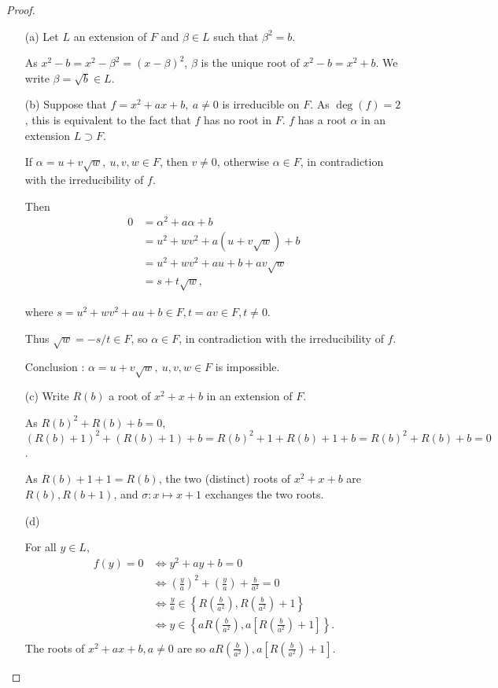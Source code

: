 \documentclass[11pt,a4paper]{article}
\begin{document}
\begin{proof}
\begin{enumerate}
\item[(a)]
Let $L$ an extension of $F$ and $\beta \in L$ such that $\beta^2 = b$.

As $x^2 - b = x^2 - \beta^2 = (x - \beta)^2$, $\beta$ is the unique root of $x^2-b = x^2+b$. We write $\beta = \sqrt{b} \in L$.

\item[(b)]
Suppose that  $f = x^2+ax+b, \ a\ne 0$ is irreducible on $F$. As $\deg(f) = 2$, this is equivalent to the fact that $f$ has no root in $F$.
 $f $ has a root $\alpha$ in an extension $L \supset F$.
 
If $\alpha = u+v\sqrt{w},\ u,v,w \in F$, then $v\neq 0$, otherwise $\alpha \in F$, in contradiction with the irreducibility of $f$.
 
 Then
 \begin{align*}
 0&= \alpha^2 + a \alpha + b\\
 &= u^2+wv^2 + a(u+v \sqrt{w})+ b\\
 &= u^2+wv^2+au+b + av \sqrt{w}\\
 &=s + t \sqrt{w},
 \end{align*}
 
where $s = u^2+wv^2+au+b  \in F, t = av \in F, t\neq 0$.

Thus $\sqrt{w} = -s/t \in F$, so $\alpha \in F$, in contradiction with the irreducibility of $f$.

Conclusion : $\alpha = u+v\sqrt{w},\ u,v,w \in F$ is impossible.

\item[(c)]
Write $R(b)$ a root of $x^2+x+b$ in an extension of $F$.

As $R(b)^2+R(b)+b=0$, $(R(b)+1)^2 + (R(b) +1)+b = R(b)^2+1 + R(b)+1+b = R(b)^2+R(b)+b=0$.

As $R(b)+1+1 = R(b)$, the two (distinct) roots of  $x^2+x+b$ are $R(b),R(b+1)$, and  $\sigma : x\mapsto x+1$ exchanges the two roots.

\item[(d)]

For all $y \in L$,
\begin{align*}
f(y) =0 &\iff y^2+ay+b=0\\
&\iff \left(\frac{y}{a}\right ) ^2 + \left(\frac{y}{a}\right ) + \frac{b}{a^2} = 0\\
&\iff \frac{y}{a} \in \left \{R \left(\frac{b}{a^2}\right ) , R \left(\frac{b}{a^2}\right ) +1 \right \}\\
&\iff y \in \left \{aR \left(\frac{b}{a^2}\right ) , a\left [R \left(\frac{b}{a^2}\right ) +1\right] \right \}.\\
\end{align*}
The roots of $x^2+ax+b,a\neq 0$ are so $aR \left(\frac{b}{a^2}\right ) , a\left [R \left(\frac{b}{a^2}\right ) +1\right] $.
\end{enumerate}
\end{proof}
\end{document}
